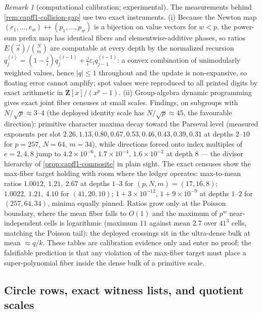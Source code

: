 \documentclass[11pt]{article}
\theoremstyle{definition}
\theoremstyle{remark}
\newtheorem{remark}[remark]{Remark}
\begin{document}
\begin{remark}[computational calibration; experimental]\label{rem:capff1-calibration}
The measurements behind \cref{rem:capff1-collision-gap} use two exact instruments.  \textup{(i)}  Because the Newton map $(e_1,\ldots,e_w)\leftrightarrow(p_1,\ldots,p_w)$ is a bijection on value vectors for $w<p$, the power-sum prefix map has identical fibers and elementwise-additive phases, so ratios $E(\vec s)/\binom Nm$ are computable at every depth by the normalized recursion $q_j^{(i)}=(1-\tfrac ji)q_j^{(i-1)}+\tfrac ji\varepsilon_iq_{j-1}^{(i-1)}$: a convex combination of unimodularly weighted values, hence $|q|\le1$ throughout and the update is non-expansive, so floating error cannot amplify; spot values were reproduced to all printed digits by exact arithmetic in $\mathbf Z[x]/(x^p-1)$.  \textup{(ii)}  Group-algebra dynamic programming gives exact joint fiber censuses at small scales.  Findings, on subgroups with $N/\sqrt p\approx3$--$4$ \textup{(the deployed identity scale has $N/\sqrt p\approx45$, the favourable direction)}: primitive character maxima decay toward the Parseval level \textup{(measured exponents per slot $2.26,1.13,0.80,0.67,0.53,0.46,0.43,0.39,0.31$ at depths $2$--$10$ for $p=257$, $N=64$, $m=34$)}, while directions forced onto index multiples of $e=2,4,8$ jump to $4.2\times10^{-6}$, $1.7\times10^{-4}$, $1.6\times10^{-2}$ at depth $8$ --- the divisor hierarchy of \cref{prop:capff1-composite} in plain sight.  The exact censuses show the max-fiber target holding with room where the ledger operates: max-to-mean ratios $1.0012,\ 1.21,\ 2.67$ at depths $1$--$3$ for $(p,N,m)=(17,16,8)$; $1.0022,\ 1.21,\ 4.10$ for $(41,20,10)$; $1+3\times10^{-12}$, $1+9\times10^{-9}$ at depths $1$--$2$ for $(257,64,34)$, minima equally pinned.  Ratios grow only at the Poisson boundary, where the mean fiber falls to $O(1)$ and the maximum of $p^w$ near-independent cells is logarithmic \textup{(maximum $11$ against mean $2.7$ over $41^3$ cells, matching the Poisson tail)}; the deployed crossings sit in the ultra-dense bulk at mean $\approx q/k$.  These tables are calibration evidence only and enter no proof; the falsifiable prediction is that any violation of the max-fiber target must place a super-polynomial fiber inside the dense bulk of a primitive scale.
\end{remark}

\subsection{Circle rows, exact witness lists, and quotient scales}
\end{document}
